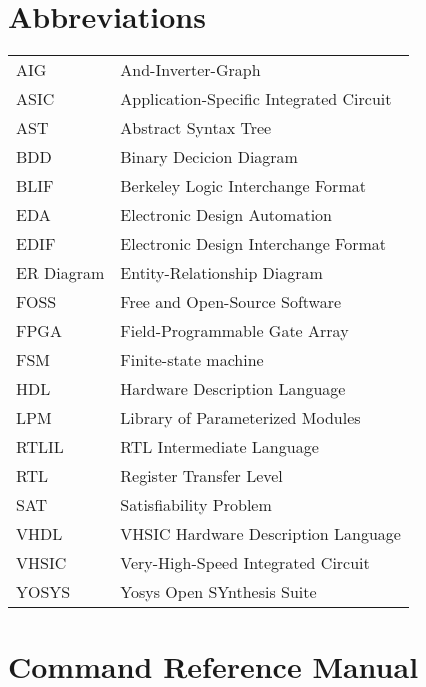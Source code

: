 \documentclass[oneside,a4paper]{book}
\begin{document}
\chapter*{Abbreviations}
\begin{tabular}{ll}
AIG         & And-Inverter-Graph \\
ASIC        & Application-Specific Integrated Circuit \\
AST         & Abstract Syntax Tree \\
BDD         & Binary Decicion Diagram \\
BLIF        & Berkeley Logic Interchange Format \\
EDA         & Electronic Design Automation \\
EDIF        & Electronic Design Interchange Format \\
ER Diagram  & Entity-Relationship Diagram \\
FOSS        & Free and Open-Source Software \\
FPGA        & Field-Programmable Gate Array \\
FSM         & Finite-state machine \\
HDL         & Hardware Description Language \\
LPM         & Library of Parameterized Modules \\
RTLIL       & RTL Intermediate Language \\
RTL         & Register Transfer Level \\
SAT         & Satisfiability Problem \\
VHDL        & VHSIC Hardware Description Language \\
VHSIC       & Very-High-Speed Integrated Circuit \\
YOSYS       & Yosys Open SYnthesis Suite \\
\end{tabular}

\tableofcontents













\appendix




\chapter{Command Reference Manual}
\label{commandref}








\end{document}
